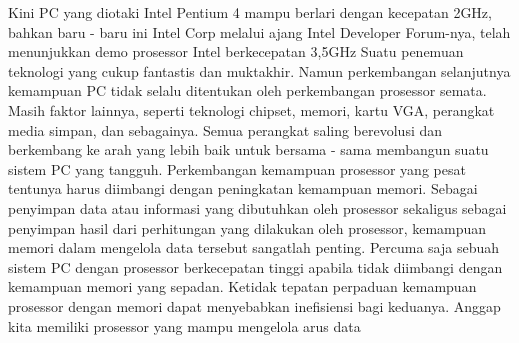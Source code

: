 Kini PC yang diotaki Intel Pentium 4 mampu berlari dengan kecepatan 2GHz, bahkan baru - baru ini Intel Corp melalui ajang Intel Developer Forum-nya, telah menunjukkan demo prosessor Intel berkecepatan 3,5GHz Suatu penemuan teknologi yang cukup fantastis dan muktakhir. Namun perkembangan selanjutnya kemampuan PC tidak selalu ditentukan oleh perkembangan prosessor semata.
Masih faktor lainnya, seperti teknologi chipset, memori, kartu VGA, perangkat media simpan, dan sebagainya. Semua perangkat saling berevolusi dan berkembang ke arah yang lebih baik untuk bersama - sama membangun suatu sistem PC yang tangguh. Perkembangan kemampuan prosessor yang pesat tentunya harus diimbangi dengan peningkatan kemampuan memori. Sebagai penyimpan data atau informasi yang dibutuhkan oleh prosessor sekaligus sebagai penyimpan hasil dari perhitungan yang dilakukan oleh prosessor, kemampuan memori dalam mengelola data tersebut sangatlah penting. Percuma saja sebuah sistem PC dengan prosessor berkecepatan tinggi apabila tidak diimbangi dengan kemampuan memori yang sepadan. Ketidak tepatan perpaduan kemampuan prosessor dengan memori dapat menyebabkan inefisiensi bagi keduanya. Anggap kita memiliki prosessor yang mampu mengelola arus data
